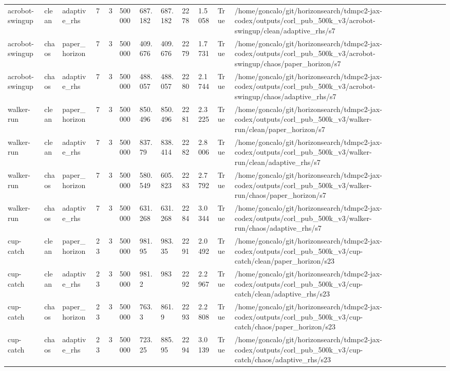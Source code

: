 \begin{tabular}{llllllllllll}
acrobot-swingup & clean & adaptive\_rhs & 7 & 3 & 500000 & 687.182 & 687.182 & 2278 & 1.5058 & True & /home/goncalo/git/horizonsearch/tdmpc2-jax-codex/outputs/corl\_pub\_500k\_v3/acrobot-swingup/clean/adaptive\_rhs/s7 \\
acrobot-swingup & chaos & paper\_horizon & 7 & 3 & 500000 & 409.676 & 409.676 & 2279 & 1.7731 & True & /home/goncalo/git/horizonsearch/tdmpc2-jax-codex/outputs/corl\_pub\_500k\_v3/acrobot-swingup/chaos/paper\_horizon/s7 \\
acrobot-swingup & chaos & adaptive\_rhs & 7 & 3 & 500000 & 488.057 & 488.057 & 2280 & 2.1744 & True & /home/goncalo/git/horizonsearch/tdmpc2-jax-codex/outputs/corl\_pub\_500k\_v3/acrobot-swingup/chaos/adaptive\_rhs/s7 \\
walker-run & clean & paper\_horizon & 7 & 3 & 500000 & 850.496 & 850.496 & 2281 & 2.3225 & True & /home/goncalo/git/horizonsearch/tdmpc2-jax-codex/outputs/corl\_pub\_500k\_v3/walker-run/clean/paper\_horizon/s7 \\
walker-run & clean & adaptive\_rhs & 7 & 3 & 500000 & 837.79 & 838.414 & 2282 & 2.8006 & True & /home/goncalo/git/horizonsearch/tdmpc2-jax-codex/outputs/corl\_pub\_500k\_v3/walker-run/clean/adaptive\_rhs/s7 \\
walker-run & chaos & paper\_horizon & 7 & 3 & 500000 & 580.549 & 605.823 & 2283 & 2.7792 & True & /home/goncalo/git/horizonsearch/tdmpc2-jax-codex/outputs/corl\_pub\_500k\_v3/walker-run/chaos/paper\_horizon/s7 \\
walker-run & chaos & adaptive\_rhs & 7 & 3 & 500000 & 631.268 & 631.268 & 2284 & 3.0344 & True & /home/goncalo/git/horizonsearch/tdmpc2-jax-codex/outputs/corl\_pub\_500k\_v3/walker-run/chaos/adaptive\_rhs/s7 \\
cup-catch & clean & paper\_horizon & 23 & 3 & 500000 & 981.95 & 983.35 & 2291 & 2.0492 & True & /home/goncalo/git/horizonsearch/tdmpc2-jax-codex/outputs/corl\_pub\_500k\_v3/cup-catch/clean/paper\_horizon/s23 \\
cup-catch & clean & adaptive\_rhs & 23 & 3 & 500000 & 981.2 & 983 & 2292 & 2.2967 & True & /home/goncalo/git/horizonsearch/tdmpc2-jax-codex/outputs/corl\_pub\_500k\_v3/cup-catch/clean/adaptive\_rhs/s23 \\
cup-catch & chaos & paper\_horizon & 23 & 3 & 500000 & 763.3 & 861.9 & 2293 & 2.2808 & True & /home/goncalo/git/horizonsearch/tdmpc2-jax-codex/outputs/corl\_pub\_500k\_v3/cup-catch/chaos/paper\_horizon/s23 \\
cup-catch & chaos & adaptive\_rhs & 23 & 3 & 500000 & 723.25 & 885.95 & 2294 & 3.0139 & True & /home/goncalo/git/horizonsearch/tdmpc2-jax-codex/outputs/corl\_pub\_500k\_v3/cup-catch/chaos/adaptive\_rhs/s23 \\

\end{tabular}
